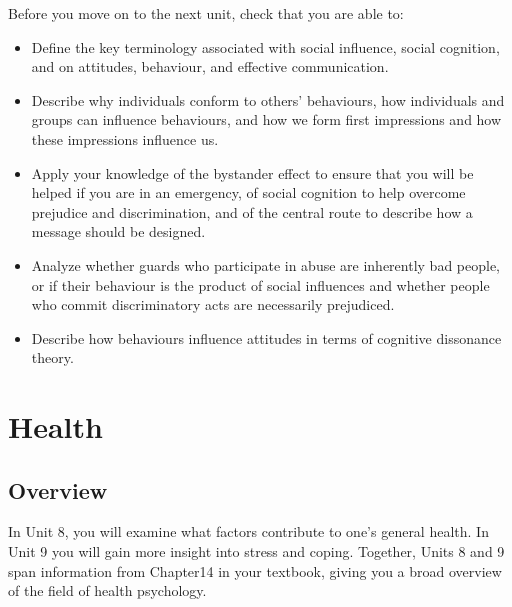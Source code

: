 \documentclass[
]{book}
\begin{document}
\begin{progress}
Before you move on to the next unit, check that you are able to:

\begin{itemize}
\item
  Define the key terminology associated with social influence, social cognition, and on attitudes, behaviour, and effective communication.
\item
  Describe why individuals conform to others' behaviours, how individuals and groups can influence behaviours, and how we form first impressions and how these impressions influence us.
\item
  Apply your knowledge of the bystander effect to ensure that you will be helped if you are in an emergency, of social cognition to help overcome prejudice and discrimination, and of the central route to describe how a message should be designed.
\item
  Analyze whether guards who participate in abuse are inherently bad people, or if their behaviour is the product of social influences and whether people who commit discriminatory acts are necessarily prejudiced.
\item
  Describe how behaviours influence attitudes in terms of cognitive dissonance theory.
\end{itemize}
\end{progress}

\hypertarget{health}{%
\chapter{Health}\label{health}}

\hypertarget{overview-7}{%
\section*{Overview}\label{overview-7}}

In Unit 8, you will examine what factors contribute to one's general health. In Unit 9 you will gain more insight into stress and coping. Together, Units 8 and 9 span information from Chapter14 in your textbook, giving you a broad overview of the field of health psychology.
\end{document}

